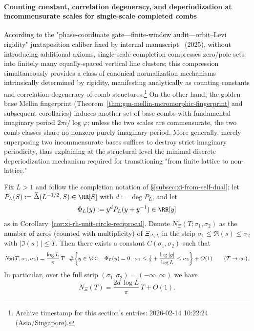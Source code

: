 \paragraph{Counting constant, correlation degeneracy, and deperiodization at incommensurate scales for single-scale completed combs}
According to the "phase-coordinate gate—finite-window audit—orbit–Levi rigidity" juxtaposition caliber fixed by internal manuscript~\cite{Internal2025ResolutionFoldingPhiPi} (2025), without introducing additional axioms, single-scale completion compresses zero/pole sets into finitely many equally-spaced vertical line clusters; this compression simultaneously provides a class of canonical normalization mechanisms intrinsically determined by rigidity, manifesting analytically as counting constants and correlation degeneracy of comb structures.\footnote{Archive timestamp for this section's entries: 2026-02-14 10:22:24 (Asia/Singapore).}
On the other hand, the golden-base Mellin fingerprint (Theorem~\ref{thm:gm-mellin-meromorphic-fingerprint} and subsequent corollaries) induces another set of base combs with fundamental imaginary period \(2\pi i/\log\varphi\); unless the two scales are commensurate, the two comb classes share no nonzero purely imaginary period. More generally, merely superposing two incommensurate bases suffices to destroy strict imaginary periodicity, thus explaining at the structural level the minimal discrete deperiodization mechanism required for transitioning "from finite lattice to non-lattice."

\begin{proposition}\label{prop:xi-single-scale-completed-zero-count-leading-constant}
Fix \(L>1\) and follow the completion notation of \S\ref{subsec:xi-from-self-dual}:
let
\(
P_L(S):=\widehat\Delta(L^{-1/2},S)\in\RR[S]
\)
with \(d:=\deg P_L\), and let
\[
\Phi_L(y):=y^{d}P_L(y+y^{-1})\in\RR[y]
\]
as in Corollary~\ref{cor:xi-rh-unit-circle-reciprocal}.
Denote \(N_{\Xi}(T;\sigma_1,\sigma_2)\) as the number of zeros (counted with multiplicity) of \(\Xi_{\Delta,L}\) in the strip \(\sigma_1\le \Re(s)\le \sigma_2\) with \(|\Im(s)|\le T\).
Then there exists a constant \(C(\sigma_1,\sigma_2)\) such that
\[
N_{\Xi}(T;\sigma_1,\sigma_2)
=\frac{\log L}{\pi}\,T\cdot
\#\!\left\{
y\in\CC:\ \Phi_L(y)=0,\
\sigma_1\le \tfrac12+\frac{\log|y|}{\log L}\le \sigma_2
\right\}
+O(1)\qquad(T\to\infty).
\]
In particular, over the full strip \((\sigma_1,\sigma_2)=(-\infty,\infty)\) we have
\[
N_{\Xi}(T)
=\frac{2d\,\log L}{\pi}\,T+O(1).
\]
\end{proposition}

